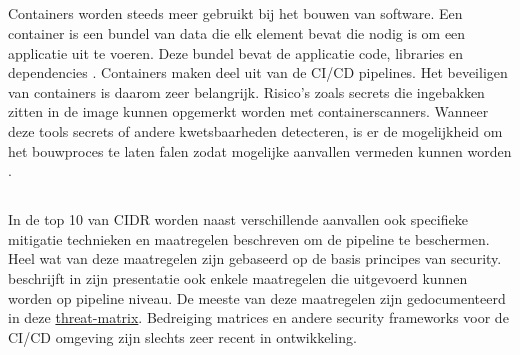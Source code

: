 \subsection{}%
\label{sec:Beheer van secrets in containers}
Containers worden steeds meer gebruikt bij het bouwen van software. Een container is een bundel van data die elk element bevat die nodig is om een applicatie uit te voeren. Deze bundel bevat de applicatie code, libraries en dependencies \autocite{Levine2020}. Containers maken deel uit van de CI/CD pipelines. Het beveiligen van containers is daarom zeer belangrijk. Risico's zoals secrets die ingebakken zitten in de image kunnen opgemerkt worden met containerscanners. Wanneer deze tools secrets of andere kwetsbaarheden detecteren, is er de mogelijkheid om het bouwproces te laten falen zodat mogelijke aanvallen vermeden kunnen worden \autocite{Agarwal2021}. 


\subsection{}%
\label{sec:Beheer van de pipeline en opstellen van security raamwerken aan de hand van een bedreigingsmatrix}
In de top 10 van CIDR \textcite{Security2022} worden naast verschillende aanvallen ook specifieke mitigatie technieken en maatregelen beschreven om de pipeline te beschermen. Heel wat van deze maatregelen zijn gebaseerd op de basis principes van security. \textcite{Suezawa2021} beschrijft in zijn presentatie ook enkele maatregelen die uitgevoerd kunnen worden op pipeline niveau. De meeste van deze maatregelen zijn gedocumenteerd in deze \href{https://github.com/rung/threat-matrix-cicd}{threat-matrix}. Bedreiging matrices en andere security frameworks voor de CI/CD omgeving zijn slechts zeer recent in ontwikkeling.
\newline


